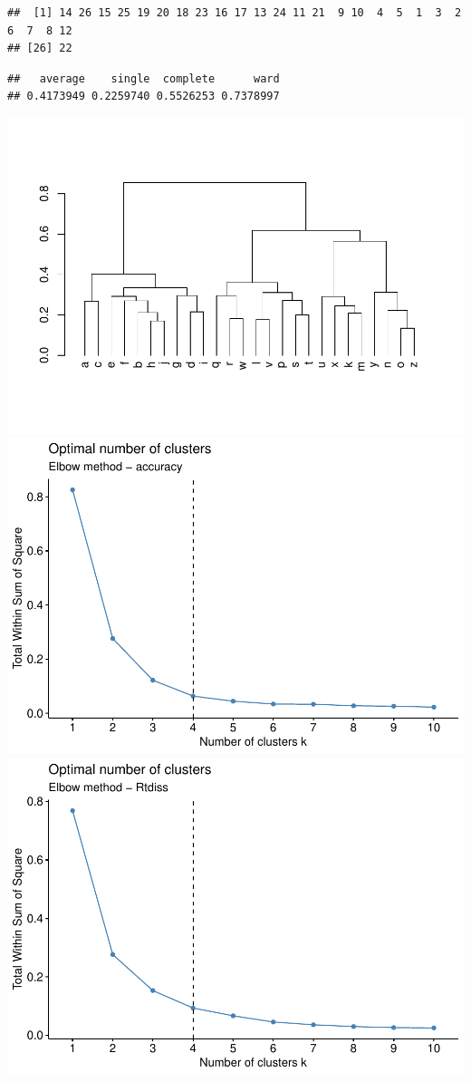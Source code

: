 \documentclass[english,man]{apa7}
\begin{document}
\begin{verbatim}
##  [1] 14 26 15 25 19 20 18 23 16 17 13 24 11 21  9 10  4  5  1  3  2  6  7  8 12
## [26] 22
\end{verbatim}

\begin{verbatim}
##   average    single  complete      ward 
## 0.4173949 0.2259740 0.5526253 0.7378997
\end{verbatim}

\includegraphics{BF_ms_1_files/figure-latex/Hierarchical clustering bl-2.pdf} \includegraphics{BF_ms_1_files/figure-latex/Hierarchical clustering bl-3.pdf} \includegraphics{BF_ms_1_files/figure-latex/Hierarchical clustering bl-4.pdf}
\end{document}
